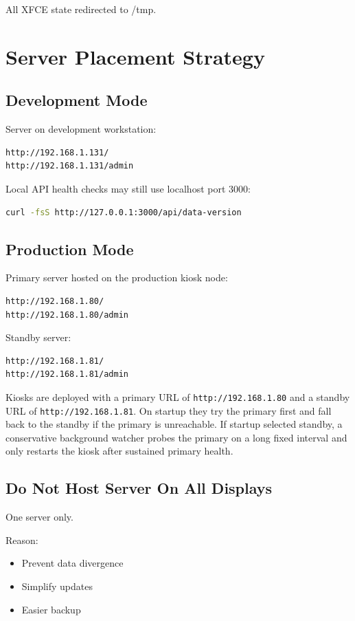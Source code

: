 \documentclass[11pt,letterpaper]{article}
\begin{document}
All XFCE state redirected to /tmp.

\section{Server Placement Strategy}

\subsection{Development Mode}

Server on development workstation:
\begin{lstlisting}
http://192.168.1.131/
http://192.168.1.131/admin
\end{lstlisting}

Local API health checks may still use localhost port 3000:
\begin{lstlisting}[language=bash]
curl -fsS http://127.0.0.1:3000/api/data-version
\end{lstlisting}

\subsection{Production Mode}

Primary server hosted on the production kiosk node:
\begin{lstlisting}
http://192.168.1.80/
http://192.168.1.80/admin
\end{lstlisting}

Standby server:
\begin{lstlisting}
http://192.168.1.81/
http://192.168.1.81/admin
\end{lstlisting}

Kiosks are deployed with a primary URL of \texttt{http://192.168.1.80} and a
standby URL of \texttt{http://192.168.1.81}. On startup they try the primary
first and fall back to the standby if the primary is unreachable. If startup
selected standby, a conservative background watcher probes the primary on a long
fixed interval and only restarts the kiosk after sustained primary health.

\subsection{Do Not Host Server On All Displays}

One server only.

Reason:
\begin{itemize}
\item Prevent data divergence
\item Simplify updates
\item Easier backup
\end{itemize}
\end{document}
